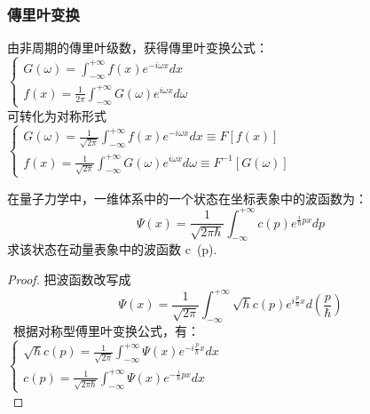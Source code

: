 \subsubsection{傳里叶变换 }
由非周期的傳里叶级数，获得傳里叶变换公式：\\
$\displaystyle \begin{cases}
	G(\omega) =\int_{-\infty}^{+\infty}  f(x) e^{-i\omega x} dx \\
	f(x) =\frac{1}{2\pi} \int_{-\infty}^{+\infty}  G(\omega) e^{i\omega x} d\omega
\end{cases}$ \\

{可转化为对称形式}\\ 
$\displaystyle \begin{cases}
	G(\omega) =\frac{1}{\sqrt{2\pi}} \int_{-\infty}^{+\infty}  f(x) e^{-i\omega x} dx  \equiv F[f(x)]\\
	f(x) =\frac{1}{\sqrt{2\pi}}  \int_{-\infty}^{+\infty}  G(\omega) e^{i\omega x} d\omega  \equiv F^{-1}[G(\omega)]
\end{cases}$ \\

\begin{example} %
	在量子力学中，一维体系中的一个状态在坐标表象中的波函数为：
	\begin{equation*}
	\Psi(x)=\frac{1}{\sqrt{2\pi \hbar}}  \int_{-\infty}^{+\infty} c(p) e^{\frac{i}{\hbar} px} dp 
    \end{equation*}   
   求该状态在动量表象中的波函数 c (p).
	\begin{proof} 
		把波函数改写成  \\
		\begin{equation*}
		\Psi(x)= \frac{1}{\sqrt{2\pi }} \int_{-\infty}^{+\infty} \sqrt{\hbar} c(p) e^{i\frac{p}{\hbar} x} d(\frac{p}{\hbar})  
		\end{equation*}     
	 根据对称型傅里叶变换公式，有： \\
	$\displaystyle \begin{cases}
		\sqrt{\hbar} c(p) = \frac{1}{\sqrt{2\pi }} \int_{-\infty}^{+\infty} \Psi(x) e^{-i\frac{p}{\hbar} x} dx\\
		c(p) = \frac{1}{\sqrt{2\pi \hbar }} \int_{-\infty}^{+\infty} \Psi(x) e^{-\frac{i}{\hbar} px} dx
	\end{cases}$ \\  
	\end{proof}
\end{example}

